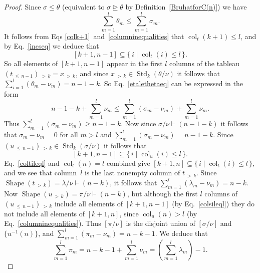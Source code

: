\documentclass[ALCO,ThmDefs,Unicode,epreuves]{cedram}
\DeclareMathOperator{\col}{col}
\newcommand{\morethan}[2]{#1\,{_{>\,#2}}}
\newcommand{\Lessthan}[2]{#1\,{_{\leqslant\,#2}}}
\DeclareMathOperator{\STD}{Std}
\DeclareMathOperator{\shape}{Shape}
\begin{document}
\begin{proof}
Since $\sigma\leqslant\theta$ (equivalent to $\sigma\trianglerighteq\theta$ by Definition~\ref{BruhatforC(n)}) we have
\begin{equation}\label{etalethetaeq}
\sum_{m=1}^l\theta_m\leqslant\sum_{m=1}^l\sigma_m.
\end{equation}
It follows from Eqs \eqref{colk+1}~and~\eqref{columninequalities} that $\col_t(k+1)\leqslant l$,
and by Eq.~\eqref{incseq} we deduce that
\begin{equation}\label{coltileql}
[k+1,n-1]\subseteq\{\,i\mid\col_t(i)\leqslant l\,\}.
\end{equation}
So all elements of $[k+1,n-1]$ appear in the first $l$ columns of
the tableau $\morethan{(\Lessthan t{n-1})}k=\morethan xk$, and since
$\morethan xk\in\STD_k(\theta/\nu)$ it follows that $\sum_{i=1}^l(\theta_m-\nu_m)=n-1-k$.
So Eq.~\eqref{etalethetaeq} can be expressed in the form
\begin{equation*}
n-1-k + \sum_{m=1}^l\nu_m \leqslant\sum_{m=1}^l (\sigma_m-\nu_m) + \sum_{m=1}^l\nu_m.
\end{equation*}
Thus $\sum_{m=1}^l (\sigma_m-\nu_m)\geqslant n-1-k$. Now since
$\sigma/\nu\vdash(n-1-k)$ it follows that $\sigma_m-\nu_m=0$ for
all $m>l$ and $\sum_{m=1}^l (\sigma_m-\nu_m)= n-1-k$.
Since $\morethan{(\Lessthan u{n-1})}k\in\STD_k(\sigma/\nu)$ it follows that
\begin{equation}\label{colsileql}
[k+1,n-1]\subseteq\{\,i\mid\col_u(i)\leqslant l\,\}.
\end{equation}
Eq.~\eqref{coltileql} and $\col_t(n)=l$ combined give
$[k+1,n]\subseteq\{\,i\mid\col_t(i)\leqslant l\,\}$, and we see that
column~$l$ is the last nonempty column of $\morethan tk$. Since
$\shape(\morethan tk)=\lambda/\nu\vdash (n-k)$,
it follows that $\sum_{m=1}^l(\lambda_m-\nu_m)=n-k$. Now
$\shape(\morethan uk)=\pi/\nu\vdash (n-k)$, but although
the first $l$ columns of $\morethan{(\Lessthan u{n-1})}k$ include
all elements of $[k+1,n-1]$ (by Eq.~\eqref{colsileql}) they do not include
all elements of $[k+1,n]$, since $\col_u(n)>l$ (by Eq.~\eqref{columninequalities}).
Thus $[\pi/\nu]$ is the disjoint union of $[\sigma/\nu]$ and $\{u^{-1}(n)\}$, and
$\sum_{m=1}^l(\pi_m-\nu_m)=n-k-1$. We deduce that
\begin{equation}\label{smuonemorethansnu}
\sum_{m=1}^l\pi_m = n-k-1+\sum_{m=1}^l\nu_m=
\left(\sum_{m=1}^l\lambda_m\right)-1.
\end{equation}


\end{proof}
\end{document}
